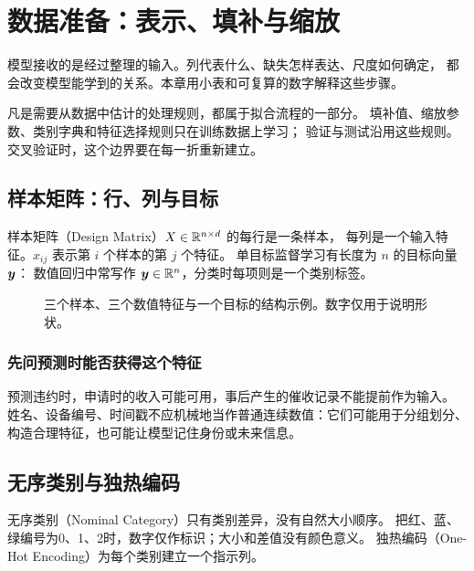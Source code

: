 \chapter{数据准备：表示、填补与缩放}
\label{ch:data}

模型接收的是经过整理的输入。列代表什么、缺失怎样表达、尺度如何确定，
都会改变模型能学到的关系。本章用小表和可复算的数字解释这些步骤。

\begin{keyidea}
凡是需要从数据中估计的处理规则，都属于拟合流程的一部分。
填补值、缩放参数、类别字典和特征选择规则只在训练数据上学习；
验证与测试沿用这些规则。交叉验证时，这个边界要在每一折重新建立。
\end{keyidea}

\section{样本矩阵：行、列与目标}
\label{sec:data-matrix}
样本矩阵（Design Matrix）$X\in\mathbb{R}^{n\times d}$ 的每行是一条样本，
每列是一个输入特征。$x_{ij}$ 表示第 $i$ 个样本的第 $j$ 个特征。
单目标监督学习有长度为 $n$ 的目标向量 $\boldsymbol{y}$：
数值回归中常写作 $\boldsymbol{y}\in\mathbb{R}^n$，分类时每项则是一个类别标签。

\begin{figure}[htbp]
\centering
\caption{三个样本、三个数值特征与一个目标的结构示例。数字仅用于说明形状。}
\par\smallskip
{}
\end{figure}

\subsection{先问预测时能否获得这个特征}
预测违约时，申请时的收入可能可用，事后产生的催收记录不能提前作为输入。
姓名、设备编号、时间戳不应机械地当作普通连续数值：它们可能用于分组划分、
构造合理特征，也可能让模型记住身份或未来信息。


\section{无序类别与独热编码}
\label{sec:data-onehot}
无序类别（Nominal Category）只有类别差异，没有自然大小顺序。
把红、蓝、绿编号为0、1、2时，数字仅作标识；大小和差值没有颜色意义。
独热编码（One-Hot Encoding）为每个类别建立一个指示列。

